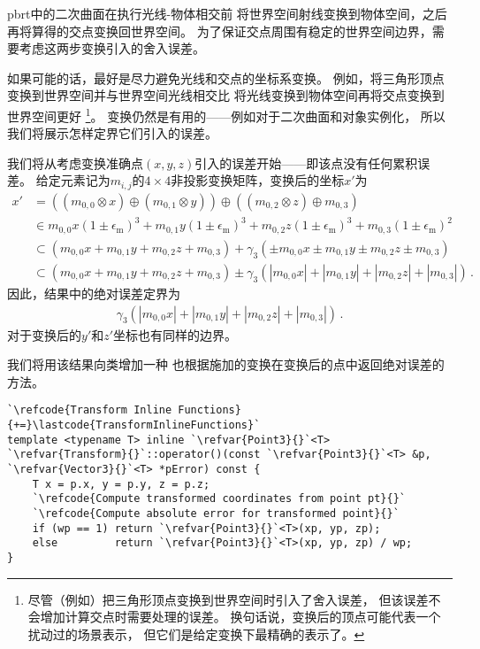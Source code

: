 pbrt中的二次曲面在执行光线-物体相交前
将世界空间射线变换到物体空间，之后再将算得的交点变换回世界空间。
为了保证交点周围有稳定的世界空间边界，需要考虑这两步变换引入的舍入误差。

如果可能的话，最好是尽力避免光线和交点的坐标系变换。
例如，将三角形顶点变换到世界空间并与世界空间光线相交比
将光线变换到物体空间再将交点变换到世界空间更好
\footnote{尽管（例如）把三角形顶点变换到世界空间时引入了舍入误差，
    但该误差不会增加计算交点时需要处理的误差。
    换句话说，变换后的顶点可能代表一个扰动过的场景表示，
    但它们是给定变换下最精确的表示了。}。
变换仍然是有用的——例如对于二次曲面和对象实例化，
所以我们将展示怎样定界它们引入的误差。

我们将从考虑变换准确点$(x,y,z)$引入的误差开始——即该点没有任何累积误差。
给定元素记为$m_{i,j}$的$4\times4$非投影变换矩阵，变换后的坐标$x'$为
\begin{align*}
    x' & =((m_{0,0}\otimes x)\oplus(m_{0,1}\otimes y))\oplus((m_{0,2}\otimes z)\oplus m_{0,3})                                                                      \\
       & \in m_{0,0}x(1\pm\epsilon_{\mathrm{m}})^3+m_{0,1}y(1\pm\epsilon_{\mathrm{m}})^3+m_{0,2}z(1\pm\epsilon_{\mathrm{m}})^3+m_{0,3}(1\pm\epsilon_{\mathrm{m}})^2 \\
       & \subset (m_{0,0}x+m_{0,1}y+m_{0,2}z+m_{0,3})+\gamma_3(\pm m_{0,0}x\pm m_{0,1}y\pm m_{0,2}z\pm m_{0,3})                                                     \\
       & \subset (m_{0,0}x+m_{0,1}y+m_{0,2}z+m_{0,3})\pm\gamma_3(|m_{0,0}x|+|m_{0,1}y|+|m_{0,2}z|+|m_{0,3}|)\, .
\end{align*}
因此，结果中的绝对误差定界为
\begin{align}\label{eq:3.16}
    \gamma_3(|m_{0,0}x|+|m_{0,1}y|+|m_{0,2}z|+|m_{0,3}|)\, .
\end{align}
对于变换后的$y'$和$z'$坐标也有同样的边界。

我们将用该结果向类增加一种
也根据施加的变换在变换后的点中返回绝对误差的方法。
\begin{lstlisting}
`\refcode{Transform Inline Functions}{+=}\lastcode{TransformInlineFunctions}`
template <typename T> inline `\refvar{Point3}{}`<T>
`\refvar{Transform}{}`::operator()(const `\refvar{Point3}{}`<T> &p, `\refvar{Vector3}{}`<T> *pError) const {
    T x = p.x, y = p.y, z = p.z;
    `\refcode{Compute transformed coordinates from point pt}{}`
    `\refcode{Compute absolute error for transformed point}{}`
    if (wp == 1) return `\refvar{Point3}{}`<T>(xp, yp, zp);
    else         return `\refvar{Point3}{}`<T>(xp, yp, zp) / wp;
}
\end{lstlisting}

